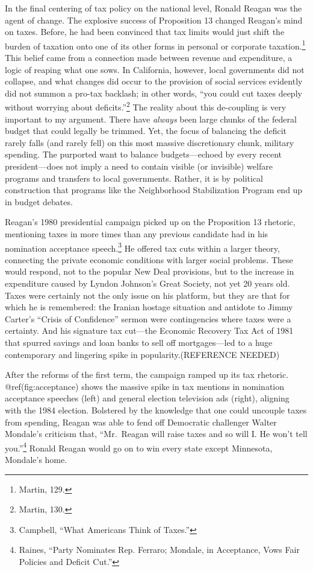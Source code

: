 \documentclass[
]{article}
\let\rmarkdownfootnote\footnote%
\def\footnote{\protect\rmarkdownfootnote}
\begin{document}
In the final centering of tax policy on the national level, Ronald
Reagan was the agent of change. The explosive success of Proposition 13
changed Reagan's mind on taxes. Before, he had been convinced that tax
limits would just shift the burden of taxation onto one of its other
forms in personal or corporate taxation.\footnote{Martin, 129.} This
belief came from a connection made between revenue and expenditure, a
logic of reaping what one sows. In California, however, local
governments did not collapse, and what changes did occur to the
provision of social services evidently did not summon a pro-tax
backlash; in other words, ``you could cut taxes deeply without worrying
about deficits.''\footnote{Martin, 130.} The reality about this
de-coupling is very important to my argument. There have \emph{always}
been large chunks of the federal budget that could legally be trimmed.
Yet, the focus of balancing the deficit rarely falls (and rarely fell)
on this most massive discretionary chunk, military spending. The
purported want to balance budgets---echoed by every recent
president---does not imply a need to contain visible (or invisible)
welfare programs and transfers to local governments. Rather, it is by
political construction that programs like the Neighborhood Stabilization
Program end up in budget debates.

Reagan's 1980 presidential campaign picked up on the Proposition 13
rhetoric, mentioning taxes in more times than any previous candidate had
in his nomination acceptance speech.\footnote{Campbell, ``What Americans
  Think of Taxes.''} He offered tax cuts within a larger theory,
connecting the private economic conditions with larger social problems.
These would respond, not to the popular New Deal provisions, but to the
increase in expenditure caused by Lyndon Johnson's Great Society, not
yet 20 years old. Taxes were certainly not the only issue on his
platform, but they are that for which he is remembered: the Iranian
hostage situation and antidote to Jimmy Carter's ``Crisis of
Confidence'' sermon were contingencies where taxes were a certainty. And
his signature tax cut---the Economic Recovery Tax Act of 1981 that
spurred savings and loan banks to sell off mortgages---led to a huge
contemporary and lingering spike in popularity.(REFERENCE NEEDED)

After the reforms of the first term, the campaign ramped up its tax
rhetoric. @ref(fig:acceptance) shows the massive spike in tax mentions
in nomination acceptance speeches (left) and general election television
ads (right), aligning with the 1984 election. Bolstered by the knowledge
that one could uncouple taxes from spending, Reagan was able to fend off
Democratic challenger Walter Mondale's criticism that, ``Mr.~Reagan will
raise taxes and so will I. He won't tell you.''\footnote{Raines, ``Party
  Nominates Rep. Ferraro; Mondale, in Acceptance, Vows Fair Policies and
  Deficit Cut.''} Ronald Reagan would go on to win every state except
Minnesota, Mondale's home.
\end{document}
